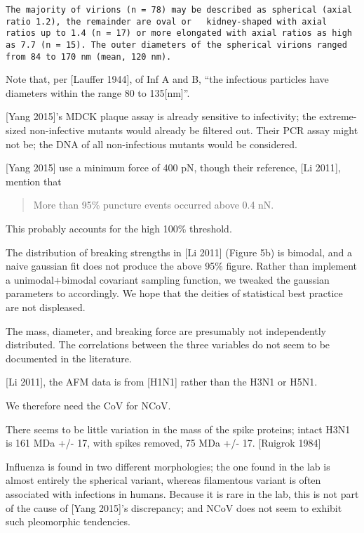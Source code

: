 \documentclass[11pt]{article}
\begin{document}
\begin{verbatim}
The majority of virions (n = 78) may be described as spherical (axial ratio 1.2), the remainder are oval or   kidney-shaped with axial ratios up to 1.4 (n = 17) or more elongated with axial ratios as high as 7.7 (n = 15). The outer diameters of the spherical virions ranged from 84 to 170 nm (mean, 120 nm).
\end{verbatim}

Note that, per {[}Lauffer 1944{]}, of Inf A and B, ``the infectious
particles have diameters within the range 80 to 135{[}nm{]}''.

{[}Yang 2015{]}'s MDCK plaque assay is already sensitive to infectivity;
the extreme-sized non-infective mutants would already be filtered out.
Their PCR assay might not be; the DNA of all non-infectious mutants
would be considered.

{[}Yang 2015{]} use a minimum force of 400 pN, though their reference,
{[}Li 2011{]}, mention that

\begin{quote}
More than 95\% puncture events occurred above 0.4 nN.
\end{quote}

This probably accounts for the high 100\% threshold.

The distribution of breaking strengths in {[}Li 2011{]} (Figure 5b) is
bimodal, and a naive gaussian fit does not produce the above 95\%
figure. Rather than implement a unimodal+bimodal covariant sampling
function, we tweaked the gaussian parameters to accordingly. We hope
that the deities of statistical best practice are not displeased.

The mass, diameter, and breaking force are presumably not independently
distributed. The correlations between the three variables do not seem to
be documented in the literature.

{[}Li 2011{]}, the AFM data is from {[}H1N1{]} rather than the H3N1 or
H5N1.

We therefore need the CoV for NCoV.

There seems to be little variation in the mass of the spike proteins;
intact H3N1 is 161 MDa +/- 17, with spikes removed, 75 MDa +/- 17.
{[}Ruigrok 1984{]}

Influenza is found in two different morphologies; the one found in the
lab is almost entirely the spherical variant, whereas filamentous
variant is often associated with infections in humans. Because it is
rare in the lab, this is not part of the cause of {[}Yang 2015{]}'s
discrepancy; and NCoV does not seem to exhibit such pleomorphic
tendencies.
\end{document}
